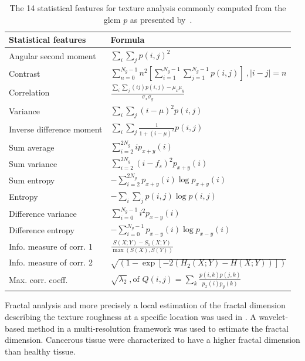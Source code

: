\begin{table}
  \caption[The 14 statistical features used in conjunction with \acs*{glcm} analysis.]{The 14 statistical features for texture analysis commonly computed from the \acs*{glcm} $p$ as presented by~\cite{Haralick1973}.}
  \scriptsize
  \renewcommand{\arraystretch}{1.5}
  \centering
  \begin{tabular}{ll}
    \toprule
    \textbf{Statistical features} & \textbf{Formula} \\
    \midrule
    Angular second moment & $\sum_i \sum_j p(i,j)^2 $  \\
    Contrast & $\sum_{n=0}^{N_g - 1} n^2 \left[ \sum_{i=1}^{N_g - 1} \sum_{j=1}^{N_g - 1} p(i,j) \right] \ , | i-j |=n  $ \\
    Correlation & $\frac{\sum_i \sum_j (ij) p(i,j) - \mu_x \mu_y}{\sigma_x \sigma_y}  $ \\
    Variance & $\sum_i \sum_j (i - \mu)^2 p(i,j)  $ \\
    Inverse difference moment & $\sum_i \sum_j \frac{1}{1+(i - \mu)^2} p(i,j)  $ \\
    Sum average & $\sum_{i=2}^{2N_g} i p_{x+y}(i)  $ \\
    Sum variance & $\sum_{i=2}^{2N_g} (i-f_s)^2 p_{x+y}(i)  $ \\
    Sum entropy & $ - \sum_{i=2}^{2N_g} p_{x+y}(i) \log p_{x+y}(i)  $ \\
    Entropy & $ - \sum_i \sum_j p(i,j) \log p(i,j) $ \\
    Difference variance & $\sum_{i=0}^{N_g-1} i^2 p_{x-y}(i)  $ \\
    Difference entropy & $ - \sum_{i=0}^{N_g-1} p_{x-y}(i) \log p_{x-y}(i)  $ \\
    Info. measure of corr. 1 & $\frac{S(X;Y)-S_1(X;Y)}{\max(S(X),S(Y))}  $ \\
    Info. measure of corr. 2 & $\sqrt{\left( 1 - \exp \left[ -2( H_2(X;Y) - H(X;Y) ) \right] \right)}  $ \\
    Max. corr. coeff. & $ \sqrt{\lambda_2} \ , \text{of } Q(i,j) = \sum_k \frac{p(i,k)p(j,k)}{p_x(i)p_y(k)}  $ \\
    \bottomrule
  \end{tabular}
  \label{tab:glcm}
\end{table}

Fractal analysis and more precisely a local estimation of the fractal dimension \cite{Benassi1998} describing the texture roughness at a specific location was used in \cite{Lopes2011}.
A wavelet-based method in a multi-resolution framework was used to estimate the fractal dimension.
Cancerous tissue were characterized to have a higher fractal dimension than healthy tissue.

